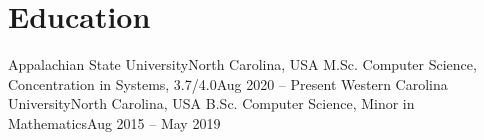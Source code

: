 \section{Education}
  \resumeSubHeadingListStart
    \resumeSubheading
      {Appalachian State University}{North Carolina, USA}
      {M.Sc. Computer Science, Concentration in Systems, 3.7/4.0}{Aug 2020 -- Present}
      \resumeItemListStart
      \resumeItemListEnd
    \resumeSubheading
      {Western Carolina University}{North Carolina, USA}
      {B.Sc. Computer Science, Minor in Mathematics}{Aug 2015 -- May 2019}
      \resumeItemListStart
      \resumeItemListEnd
  \resumeSubHeadingListEnd
